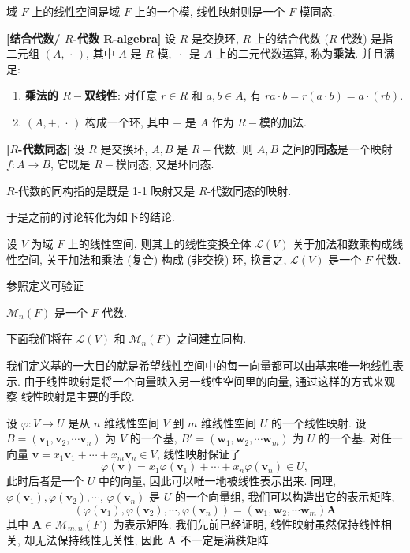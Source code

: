 \documentclass[UTF8]{book}
\begin{document}
域 $F$ 上的线性空间是域 $F$ 上的一个模, 
线性映射则是一个 $F$-模同态. 

\begin{definition}
    \textbf{[结合代数/ $R$-代数 R-algebra]} 
    设 $R$ 是交换环, $R$ 上的结合代数 ($R$-代数) 是指二元组 $(A,\,\cdot\,)$, 
    其中 $A$ 是 $R$-模, $\,\cdot\,$ 是 $A$ 上的二元代数运算, 
    称为\textbf{乘法}. 并且满足: 
    \begin{enumerate}
        \item \textbf{乘法的 $R-$双线性}: 对任意 $r\in R$ 和 $a,b \in A$, 
        有 $ra \cdot b = r(a\cdot b) = a\cdot (rb)$. 
        \item $(A,+,\,\cdot\,)$ 构成一个环, 其中 $+$ 是 $A$ 作为 
        $R-$模的加法.
    \end{enumerate}
\end{definition}

\begin{definition}
    \textbf{[$R$-代数同态]} 
    设 $R$ 是交换环, $A,B$ 是 $R-$代数. 
    则 $A,B$ 之间的\textbf{同态}是一个映射 $f: A \to B$, 
    它既是 $R-$模同态, 又是环同态. 

    $R$-代数的同构指的是既是 1-1 映射又是 $R$-代数同态的映射. 
\end{definition}

于是之前的讨论转化为如下的结论. 

\begin{proposition}
    设 $V$ 为域 $F$ 上的线性空间, 则其上的线性变换全体 
    $\mathcal{L}(V)$ 关于加法和数乘构成线性空间, 
    关于加法和乘法 (复合) 构成 (非交换) 环, 
    换言之, $\mathcal{L}(V)$ 是一个 $F$-代数. 
\end{proposition}

参照定义可验证
\begin{exercise}
    $\mathcal{M}_n(F)$ 是一个 $F$-代数. 
\end{exercise}

下面我们将在 $\mathcal{L}(V)$ 和 $\mathcal{M}_n(F)$ 之间建立同构. 

我们定义基的一大目的就是希望线性空间中的每一向量都可以由基来唯一地线性表示. 
由于线性映射是将一个向量映入另一线性空间里的向量, 通过这样的方式来观察
线性映射是主要的手段. 

设 $\varphi : V \to U$ 是从 $n$ 维线性空间 $V$ 到 $m$ 维线性空间 $U$ 
的一个线性映射. 
设 $B=(\boldsymbol{v}_1,\boldsymbol{v}_2,\cdots\boldsymbol{v}_n)$ 
为 $V$ 的一个基, 
$B' = (\boldsymbol{w}_1,\boldsymbol{w}_2,\cdots\boldsymbol{w}_m)$ 
为 $U$ 的一个基. 
对任一向量 
$\boldsymbol{v} = x_1\boldsymbol{v}_1+ \cdots + x_m\boldsymbol{v}_n
\in V$, 
线性映射保证了 
$$\varphi(\boldsymbol{v}) = x_1 \varphi(\boldsymbol{v}_1)+ 
\cdots + x_n\varphi(\boldsymbol{v}_n) \in U,$$
此时后者是一个 $U$ 中的向量, 因此可以唯一地被线性表示出来. 
同理, 
$\varphi(\boldsymbol{v}_1),\varphi(\boldsymbol{v}_2),\cdots$, 
$\varphi(\boldsymbol{v}_n)$ 是 $U$ 的一个向量组, 
我们可以构造出它的表示矩阵, 
$$ (\varphi(\boldsymbol{v}_1),\varphi(\boldsymbol{v}_2),\cdots,
\varphi(\boldsymbol{v}_n)) = (\boldsymbol{w}_1,\boldsymbol{w}_2,
\cdots\boldsymbol{w}_m)\boldsymbol{A} $$
其中 $\boldsymbol{A} \in \mathcal{M}_{m,n}(F)$ 
为表示矩阵. 
我们先前已经证明, 线性映射虽然保持线性相关, 
却无法保持线性无关性, 因此 $\boldsymbol{A}$ 不一定是满秩矩阵. 
\end{document}
